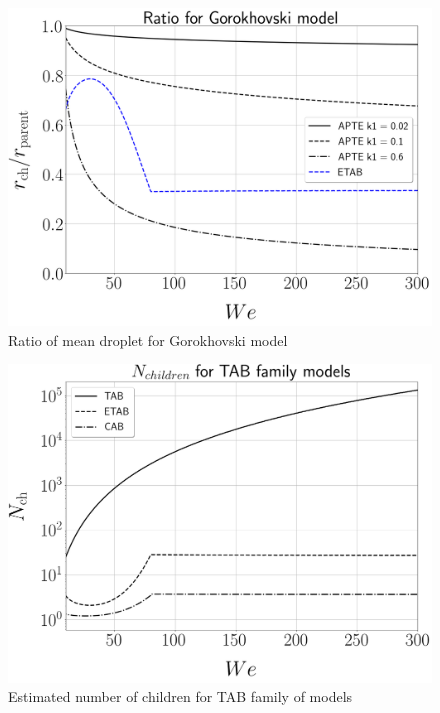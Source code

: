\begin{figure}[h!]
	\centering
	\includegraphics[scale=0.2]{./part2_developments/figures_ch4_SLI/ratio_droplet_size_gorok}
	\caption{Ratio of mean droplet for Gorokhovski model}
	\label{fig:r_ratio_gorok}
\end{figure}

\begin{figure}[h!]
	\centering
	\includegraphics[scale=0.2]{./part2_developments/figures_ch4_SLI/N_ch_TAB}
	\caption{Estimated number of children for TAB family of models}
	\label{fig:N_ch_TAB}
\end{figure}

